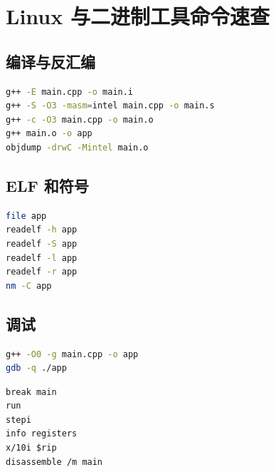 \chapter{Linux 与二进制工具命令速查}

\section{编译与反汇编}

\begin{lstlisting}[language=bash]
g++ -E main.cpp -o main.i
g++ -S -O3 -masm=intel main.cpp -o main.s
g++ -c -O3 main.cpp -o main.o
g++ main.o -o app
objdump -drwC -Mintel main.o
\end{lstlisting}

\section{ELF 和符号}

\begin{lstlisting}[language=bash]
file app
readelf -h app
readelf -S app
readelf -l app
readelf -r app
nm -C app
\end{lstlisting}

\section{调试}

\begin{lstlisting}[language=bash]
g++ -O0 -g main.cpp -o app
gdb -q ./app
\end{lstlisting}

\begin{lstlisting}
break main
run
stepi
info registers
x/10i $rip
disassemble /m main
\end{lstlisting}
